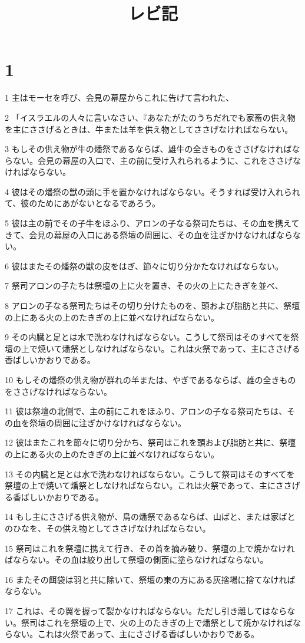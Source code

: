 

\title{レビ記}


\chapter{1}

\par 1 主はモーセを呼び、会見の幕屋からこれに告げて言われた、
\par 2 「イスラエルの人々に言いなさい、『あなたがたのうちだれでも家畜の供え物を主にささげるときは、牛または羊を供え物としてささげなければならない。
\par 3 もしその供え物が牛の燔祭であるならば、雄牛の全きものをささげなければならない。会見の幕屋の入口で、主の前に受け入れられるように、これをささげなければならない。
\par 4 彼はその燔祭の獣の頭に手を置かなければならない。そうすれば受け入れられて、彼のためにあがないとなるであろう。
\par 5 彼は主の前でその子牛をほふり、アロンの子なる祭司たちは、その血を携えてきて、会見の幕屋の入口にある祭壇の周囲に、その血を注ぎかけなければならない。
\par 6 彼はまたその燔祭の獣の皮をはぎ、節々に切り分かたなければならない。
\par 7 祭司アロンの子たちは祭壇の上に火を置き、その火の上にたきぎを並べ、
\par 8 アロンの子なる祭司たちはその切り分けたものを、頭および脂肪と共に、祭壇の上にある火の上のたきぎの上に並べなければならない。
\par 9 その内臓と足とは水で洗わなければならない。こうして祭司はそのすべてを祭壇の上で焼いて燔祭としなければならない。これは火祭であって、主にささげる香ばしいかおりである。
\par 10 もしその燔祭の供え物が群れの羊または、やぎであるならば、雄の全きものをささげなければならない。
\par 11 彼は祭壇の北側で、主の前にこれをほふり、アロンの子なる祭司たちは、その血を祭壇の周囲に注ぎかけなければならない。
\par 12 彼はまたこれを節々に切り分かち、祭司はこれを頭および脂肪と共に、祭壇の上にある火の上のたきぎの上に並べなければならない。
\par 13 その内臓と足とは水で洗わなければならない。こうして祭司はそのすべてを祭壇の上で焼いて燔祭としなければならない。これは火祭であって、主にささげる香ばしいかおりである。
\par 14 もし主にささげる供え物が、鳥の燔祭であるならば、山ばと、または家ばとのひなを、その供え物としてささげなければならない。
\par 15 祭司はこれを祭壇に携えて行き、その首を摘み破り、祭壇の上で焼かなければならない。その血は絞り出して祭壇の側面に塗らなければならない。
\par 16 またその餌袋は羽と共に除いて、祭壇の東の方にある灰捨場に捨てなければならない。
\par 17 これは、その翼を握って裂かなければならない。ただし引き離してはならない。祭司はこれを祭壇の上で、火の上のたきぎの上で燔祭として焼かなければならない。これは火祭であって、主にささげる香ばしいかおりである。

